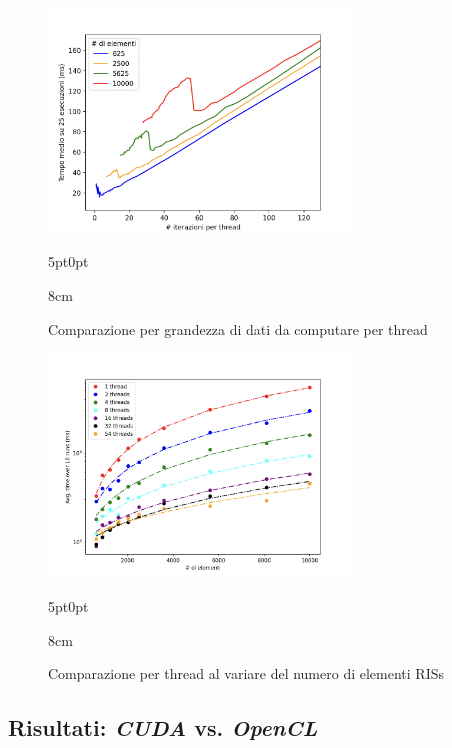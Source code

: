 \begin{figure}[!ht]
  \begin{minipage}[t]{0.5\linewidth}
    \centering
    \includegraphics[width=8cm]{images/results/gain-jobs-per-thread.png}
    \begin{adjustwidth}
      {5pt}{0pt}
      \begin{varwidth}
        {8cm}
        \caption{Comparazione per grandezza di dati da computare per thread}
        \label{fig:jobs-per-thread}
      \end{varwidth}
    \end{adjustwidth}
  \end{minipage}
  \begin{minipage}[t]{0.5\linewidth}
    \centering
    \includegraphics[width=8cm]{images/results/gain-thread-over-elem.png}
    \begin{adjustwidth}
      {5pt}{0pt}
      \begin{varwidth}
        {8cm}
        \caption{Comparazione per thread al variare del numero di elementi RISs}
        \label{fig:thread-over-elem}
      \end{varwidth}
    \end{adjustwidth}
  \end{minipage}
\end{figure}

\subsection{Risultati: \textit{CUDA} vs. \textit{OpenCL}}
\label{subsec:risultati-cuda-opencl}

